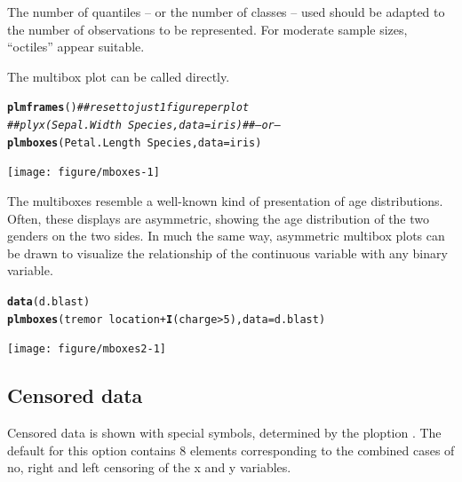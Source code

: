 \documentclass[11pt]{article}\usepackage[]{graphicx}\usepackage[]{color}
\makeatletter
\newcommand{\hlnum}[1]{\textcolor[rgb]{0.686,0.059,0.569}{#1}}%
\newcommand{\hlcom}[1]{\textcolor[rgb]{0.678,0.584,0.686}{\textit{#1}}}%
\newcommand{\hlopt}[1]{\textcolor[rgb]{0,0,0}{#1}}%
\newcommand{\hlstd}[1]{\textcolor[rgb]{0.345,0.345,0.345}{#1}}%
\newcommand{\hlkwc}[1]{\textcolor[rgb]{0.333,0.667,0.333}{#1}}%
\newcommand{\hlkwd}[1]{\textcolor[rgb]{0.737,0.353,0.396}{\textbf{#1}}}%
\newenvironment{kframe}{%
 \def\at@end@of@kframe{}%
 \ifinner\ifhmode%
  \def\at@end@of@kframe{\end{minipage}}%
  \begin{minipage}{\columnwidth}%
 \fi\fi%
 \def\FrameCommand##1{\hskip\@totalleftmargin \hskip-\fboxsep
 \colorbox{shadecolor}{##1}\hskip-\fboxsep
     \hskip-\linewidth \hskip-\@totalleftmargin \hskip\columnwidth}%
 \MakeFramed {\advance\hsize-\width
   \@totalleftmargin\z@ \linewidth\hsize
   \@setminipage}}%
 {\par\unskip\endMakeFramed%
 \at@end@of@kframe}
\newenvironment{knitrout}{}{} %
\makeatother
\begin{document}
The number of quantiles -- or the number of classes -- used should be
adapted to the number of observations to be represented.
For moderate sample sizes, ``octiles'' appear suitable.

The multibox plot can be called directly.
\begin{knitrout}
\color{fgcolor}\begin{kframe}
\begin{alltt}
\hlkwd{plmframes}\hlstd{()}  \hlcom{## reset to just 1 figure per plot}
\hlcom{## plyx(Sepal.Width~Species, data=iris)  ## -- or --}
\hlkwd{plmboxes}\hlstd{(Petal.Length}\hlopt{~}\hlstd{Species,} \hlkwc{data}\hlstd{=iris)}
\end{alltt}
\end{kframe}
\texttt{[image: figure/mboxes-1]} 

\end{knitrout}

The multiboxes %
resemble a well-known kind of
presentation of age distributions. Often, these displays are asymmetric,
showing the age distribution of the two genders on the two sides.
In much the same way, asymmetric multibox plots can be drawn to visualize
the relationship of the continuous variable with any binary variable.
\begin{knitrout}
\color{fgcolor}\begin{kframe}
\begin{alltt}
\hlkwd{data}\hlstd{(d.blast)}
\hlkwd{plmboxes}\hlstd{(tremor}\hlopt{~}\hlstd{location}\hlopt{+}\hlkwd{I}\hlstd{(charge}\hlopt{>}\hlnum{5}\hlstd{),} \hlkwc{data}\hlstd{=d.blast)}
\end{alltt}
\end{kframe}
\texttt{[image: figure/mboxes2-1]} 

\end{knitrout}

\subsection{Censored data}
Censored data is shown with special symbols, determined by the ploption
\linebreak[3]
. The default for this option contains 8 elements
corresponding to the combined cases of no, right and left censoring of 
the x and y variables.
\end{document}
